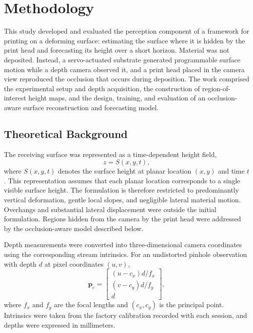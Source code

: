 \section{Methodology}
This study developed and evaluated the perception component of a framework for printing on a deforming surface: estimating the surface where it is hidden by the print head and forecasting its height over a short horizon. Material was not deposited. Instead, a servo-actuated substrate generated programmable surface motion while a depth camera observed it, and a print head placed in the camera view reproduced the occlusion that occurs during deposition. The work comprised the experimental setup and depth acquisition, the construction of region-of-interest height maps, and the design, training, and evaluation of an occlusion-aware surface reconstruction and forecasting model.

\subsection{Theoretical Background}
The receiving surface was represented as a time-dependent height field,
\begin{equation}
    z = S(x,y,t),
\end{equation}
where $S(x,y,t)$ denotes the surface height at planar location $(x,y)$ and time $t$. This representation assumes that each planar
location corresponds to a single visible surface height. The formulation is therefore restricted to predominantly vertical
deformation, gentle local slopes, and negligible lateral material motion. Overhangs and substantial lateral displacement were outside the initial formulation. Regions hidden from the camera by the print head were addressed by the occlusion-aware model described below.

Depth measurements were converted into three-dimensional camera coordinates using the corresponding stream intrinsics.
For an undistorted pinhole observation with depth $d$ at pixel coordinates $(u,v)$,
\begin{equation}
    \mathbf{p}_{c} =
    \begin{bmatrix}
        (u-c_x)d/f_x \\
        (v-c_y)d/f_y \\
        d
    \end{bmatrix},
\end{equation}
where $f_x$ and $f_y$ are the focal lengths and $(c_x,c_y)$ is the principal point. Intrinsics were taken from the factory calibration recorded with each session, and depths were expressed in millimeters.

